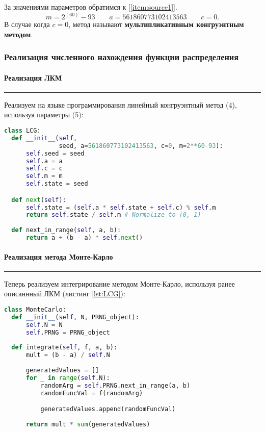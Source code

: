 \documentclass[a4paper, 14pt]{extarticle}
\begin{document}
За значениями параметров обратимся к [\ref{item:source1}].
\begin{equation}
  m = 2^{(60)} - 93 \qquad a = 561860773102413563 \qquad c = 0.
\end{equation}
В случае когда $c = 0$, метод называют \textbf{мультипликативным конгруэнтным методом}.

\subsubsection{Реализация численного нахождения функции распределения}

\paragraph{Реализация ЛКМ}\vspace{-20pt}\rule{\linewidth}{0.1mm}

Реализуем на языке программирования  линейный конгруэнтный метод (4), используя 
параметры (5):\\

\begin{lstlisting}[language=Python, caption={Реализация ЛКМ}, label={lst:LCG}]
class LCG:
  def __init__(self, 
               seed, a=561860773102413563, c=0, m=2**60-93):
      self.seed = seed
      self.a = a
      self.c = c
      self.m = m
      self.state = seed

  def next(self):
      self.state = (self.a * self.state + self.c) % self.m
      return self.state / self.m # Normalize to [0, 1)
  
  def next_in_range(self, a, b):
      return a + (b - a) * self.next()
  \end{lstlisting}

\paragraph{Реализация метода Монте-Карло}\vspace{-20pt}\rule{\linewidth}{0.1mm}

Теперь реализуем интегрирование методом Монте-Карло, используя ранее 
описаннный ЛКМ (листинг \ref{lst:LCG}):\\

\begin{lstlisting}[language=Python, caption={Реализация метода Монте-Карло}, label={lst:MonteCarlo}]
class MonteCarlo:
  def __init__(self, N, PRNG_object):
      self.N = N
      self.PRNG = PRNG_object
  
  def integrate(self, f, a, b):
      mult = (b - a) / self.N
      
      generatedValues = []
      for _ in range(self.N):
          randomArg = self.PRNG.next_in_range(a, b)
          randomFuncVal = f(randomArg)

          generatedValues.append(randomFuncVal)
      
      return mult * sum(generatedValues)
\end{lstlisting}
\end{document}
